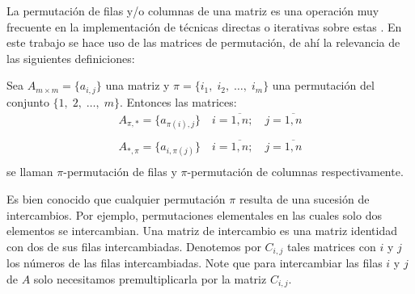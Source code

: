 La permutación de filas y/o columnas de una matriz es una operación muy frecuente en la implementación de técnicas directas o iterativas sobre estas \cite{saad2003iterative}. En este trabajo se hace uso de las matrices de permutaci\'on, de ah\'i la relevancia de las siguientes definiciones:

\begin{definition}\label{def:permutation}
	Sea $A_{m \times m} = \{a_{i,j}\}$ una matriz y $\pi = \{i_1,\; i_2,\; \dots,\; i_m\}$ una permutaci\'on del conjunto $\{1,\; 2,\; \dots,\; m\}$. Entonces las matrices:
	\begin{equation}
		\begin{array}{c}
			A_{\pi,\ast} = \{a_{\pi(i),j}\}\quad i=\overline{1,n}; \quad j=\overline{1,n}\\
			\\
			A_{\ast,\pi} = \{a_{i,\pi(j)}\}\quad i=\overline{1,n}; \quad j=\overline{1,n}\\
		\end{array}
	\end{equation}
	se llaman $\pi$-permutaci\'on de filas y $\pi$-permutaci\'on de columnas respectivamente.
\end{definition}

Es bien conocido que cualquier permutación $\pi$ resulta de una sucesi\'on de intercambios. Por ejemplo, permutaciones elementales en las cuales solo dos elementos se intercambian. Una matriz de intercambio es una matriz identidad con dos de sus filas intercambiadas. Denotemos por $C_{i,j}$ tales matrices con $i$ y $j$ los números de las filas intercambiadas. Note que para intercambiar las filas $i$ y $j$ de $A$ solo necesitamos premultiplicarla por la matriz $C_{i,j}$.


